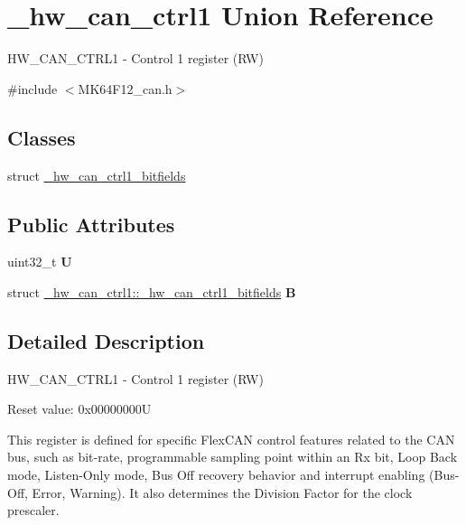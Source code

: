 \hypertarget{union__hw__can__ctrl1}{}\section{\+\_\+hw\+\_\+can\+\_\+ctrl1 Union Reference}
\label{union__hw__can__ctrl1}


H\+W\+\_\+\+C\+A\+N\+\_\+\+C\+T\+R\+L1 -\/ Control 1 register (RW)  




{\ttfamily \#include $<$M\+K64\+F12\+\_\+can.\+h$>$}

\subsection*{Classes}
\begin{DoxyCompactItemize}
\item 
struct \hyperlink{struct__hw__can__ctrl1_1_1__hw__can__ctrl1__bitfields}{\+\_\+hw\+\_\+can\+\_\+ctrl1\+\_\+bitfields}
\end{DoxyCompactItemize}
\subsection*{Public Attributes}
\begin{DoxyCompactItemize}
\item 
uint32\+\_\+t {\bfseries U}\hypertarget{union__hw__can__ctrl1_a32986cb9f9108de67b2d47cdbbb69916}{}\label{union__hw__can__ctrl1_a32986cb9f9108de67b2d47cdbbb69916}

\item 
struct \hyperlink{struct__hw__can__ctrl1_1_1__hw__can__ctrl1__bitfields}{\+\_\+hw\+\_\+can\+\_\+ctrl1\+::\+\_\+hw\+\_\+can\+\_\+ctrl1\+\_\+bitfields} {\bfseries B}\hypertarget{union__hw__can__ctrl1_ad96226f3cefab6e603838d7cf83e0f82}{}\label{union__hw__can__ctrl1_ad96226f3cefab6e603838d7cf83e0f82}

\end{DoxyCompactItemize}


\subsection{Detailed Description}
H\+W\+\_\+\+C\+A\+N\+\_\+\+C\+T\+R\+L1 -\/ Control 1 register (RW) 

Reset value\+: 0x00000000U

This register is defined for specific Flex\+C\+AN control features related to the C\+AN bus, such as bit-\/rate, programmable sampling point within an Rx bit, Loop Back mode, Listen-\/\+Only mode, Bus Off recovery behavior and interrupt enabling (Bus-\/\+Off, Error, Warning). It also determines the Division Factor for the clock prescaler. 

